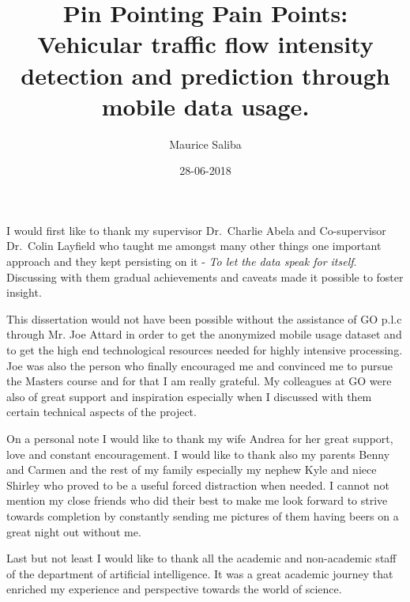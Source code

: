 \documentclass[12pt, a4paper]{report}
\theoremstyle{definition}
\theoremstyle{definition}%
\theoremstyle{definition}%
\theoremstyle{definition}%
\theoremstyle{definition}%
\theoremstyle{definition}%
\begin{document}
\title{Pin Pointing Pain Points: Vehicular traffic flow intensity detection and prediction through mobile data usage.}
\author{Maurice Saliba}
\date{28-06-2018}

\frontmatter


\begin{acknowledgements}

I would first like to thank my supervisor Dr.~Charlie Abela and Co-supervisor Dr.~Colin Layfield who taught me amongst many other things one important approach and they kept persisting on it - \textit{To let the data speak for itself}. Discussing with them gradual achievements and caveats made it possible to foster insight.

This dissertation would not have been possible without the assistance of GO p.l.c through Mr. Joe Attard in order to get the anonymized mobile usage dataset and to get the high end technological resources needed for highly intensive processing. Joe was also the person who finally encouraged me and convinced me to pursue the Masters course and for that I am really grateful. My colleagues at GO were also of great support and inspiration especially when I discussed with them certain technical aspects of the project.

On a personal note I would like to thank my wife Andrea for her great support, love and constant encouragement. I would like to thank also my parents Benny and Carmen and the rest of my family especially my nephew Kyle and niece Shirley who proved to be a useful forced distraction when needed. I cannot not mention my close friends who did their best to make me look forward to strive towards completion by constantly sending me pictures of them having beers on a great night out without me. 

Last but not least I would like to thank all the academic and non-academic staff of the department of artificial intelligence. It was a great academic journey that enriched my experience and perspective towards the world of science.



\end{acknowledgements}
       
\end{document}
